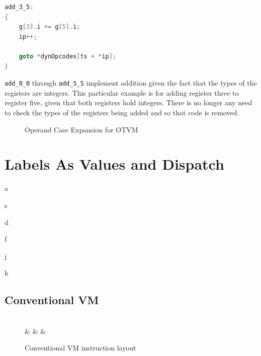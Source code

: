 \documentclass[english,a4paper,12pt]{report}
\begin{document}
\begin{lstlisting}[language=C]
add_3_5:
{
    g[3].i += g[5].i;
    ip++;

    goto *dynOpcodes[ts + *ip];
}
\end{lstlisting}

\verb|add_0_0| through \verb|add_5_5| implement addition given the fact
that the types of the registers are integers. This particular example
is for adding register three to register five, given that both
registers hold integers. There is no longer any need to check the
types of the registers being added and so that code is removed.

\begin{figure}[!htb]
	\centering
	\caption{Operand Case Expansion for OTVM}
	\label{fig:op-case-expansion-implementation-2}	
\end{figure}




\section{Labels As Values and Dispatch}
\label{sec:labels-as-addresses}
a

s

d

f

j

k


\subsection{Conventional VM}
\label{sec:conv-vm-dispatch}

\begin{figure}[!htb]
	\centering
	\begin{bytefield}[bitwidth=1.5em,endianness=big]{16}
		 \\
		 &  &  & \\
	\end{bytefield}
	\caption{Conventional VM instruction layout}
	\label{fig:convinstruction2}
\end{figure}
\end{document}
